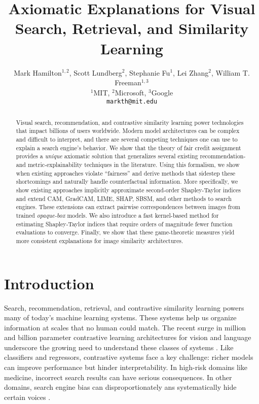 \documentclass{article} %
\title{Axiomatic Explanations for Visual Search, Retrieval, and Similarity Learning}
\author{Mark Hamilton$^{1,2}$, Scott Lundberg$^{2}$, Stephanie Fu$^{1}$, Lei Zhang$^{2}$, William T. Freeman$^{1,3}$ \\
$^{1}$MIT, $^{2}$Microsoft, $^{3}$Google \\
\texttt{markth@mit.edu} \\
}
\begin{document}
\maketitle
\vspace{-.35in}


\begin{abstract}
Visual search, recommendation, and contrastive similarity learning power technologies that impact billions of users worldwide. Modern model architectures can be complex and difficult to interpret, and there are several competing techniques one can use to explain a search engine's behavior. We show that the theory of fair credit assignment provides a \textit{unique} axiomatic solution that generalizes several existing recommendation- and metric-explainability techniques in the literature. Using this formalism, we show when existing approaches violate ``fairness'' and derive methods that sidestep these shortcomings and naturally handle counterfactual information. More specifically, we show existing approaches implicitly approximate second-order Shapley-Taylor indices and extend CAM, GradCAM, LIME, SHAP, SBSM, and other methods to search engines. These extensions can extract pairwise correspondences between images from trained \textit{opaque-box} models. We also introduce a fast kernel-based method for estimating Shapley-Taylor indices that require orders of magnitude fewer function evaluations to converge. Finally, we show that these game-theoretic measures yield more consistent explanations for image similarity architectures. 
\end{abstract}

\vspace{-.1in}
\section{Introduction}
\vspace{-.15in}
Search, recommendation, retrieval, and contrastive similarity learning powers many of today's machine learning systems. These systems help us organize information at scales that no human could match. The recent surge in million and billion parameter contrastive learning architectures for vision and language underscore the growing need to understand these classes of systems \citep{nayak_2019,mocov2,simclrv1,CLIP,SWAV}. Like classifiers and regressors, contrastive systems face a key challenge: richer models can improve performance but hinder interpretability. In high-risk domains like medicine, incorrect search results can have serious consequences. In other domains, search engine bias can disproportionately ans systematically hide certain voices \citep{mowshowitz2002assessing,diaz2008through,goldman2005search}. 
\end{document}

